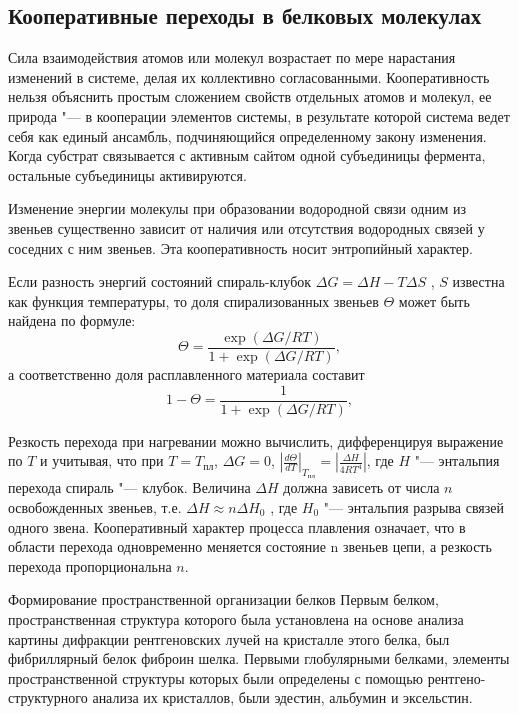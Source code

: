 \documentclass[12pt,a4paper,oneside]{book}
\begin{document}
\subsection{Кооперативные переходы в белковых молекулах}

Сила взаимодействия атомов или молекул возрастает по мере нарастания изменений в системе, делая их коллективно согласованными. Кооперативность нельзя объяснить простым сложением свойств отдельных атомов и молекул, ее природа "--- в кооперации элементов системы, в результате которой система ведет себя как единый ансамбль, подчиняющийся определенному закону изменения. Когда субстрат связывается с активным сайтом одной субъединицы фермента, остальные субъединицы активируются.

Изменение энергии молекулы при образовании водородной связи одним из звеньев существенно зависит от наличия или отсутствия водородных связей у соседних с ним звеньев. Эта кооперативность носит энтропийный характер.

Если разность энергий состояний спираль-клубок $\Delta G = \Delta H - T \Delta S$ , $S$ известна как функция температуры, то доля спирализованных звеньев $\Theta$ может быть найдена по формуле:
\begin{equation}
	\Theta = \frac{\exp(\Delta G/RT)}{1 + \exp(\Delta G/RT)},
\end{equation}
а соответственно доля расплавленного материала составит
\begin{equation}
	1 - \Theta = \frac{1}{1 + \exp(\Delta G/RT)},
\end{equation}

Резкость перехода при нагревании можно вычислить, дифференцируя выражение по $T$ и учитывая, что при $T = T_\text{пл}$, $\Delta G = 0$, $ |\frac{d \Theta}{dT}|_{T_\text{пл}} = |\frac{\Delta H}{4RT^4}|$, где $H$ "--- энтальпия перехода спираль "--- клубок. Величина $\Delta H$ должна зависеть от числа $n$ освобожденных звеньев, т.е. $\Delta H \approx n \Delta H_0$ , где $H_0$  "--- энтальпия разрыва связей одного звена. Кооперативный характер процесса плавления означает, что в области перехода одновременно меняется состояние n звеньев цепи, а резкость перехода пропорциональна $n$.

Формирование пространственной организации белков Первым белком, пространственная структура которого была установлена на основе анализа картины дифракции рентгеновских лучей на кристалле этого белка, был фибриллярный белок фиброин шелка. Первыми глобулярными белками, элементы пространственной структуры которых были определены с помощью рентгено-структурного анализа их кристаллов, были эдестин, альбумин и эксельстин.
\end{document}
